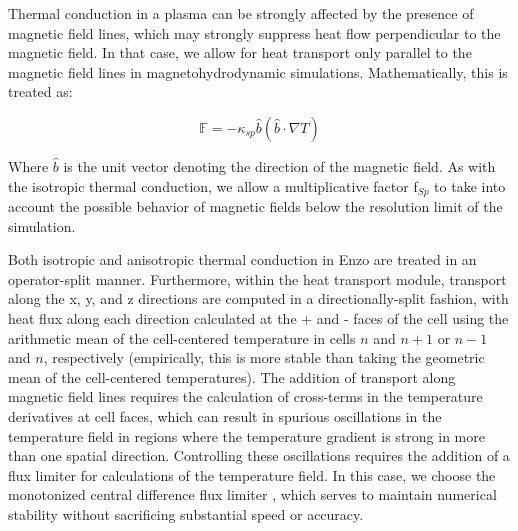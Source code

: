 Thermal conduction in a
plasma can be strongly affected by the presence of magnetic field
lines, which may strongly suppress heat flow perpendicular to the
magnetic field.  In that case, we allow for heat transport only
parallel to
the magnetic field lines in magnetohydrodynamic simulations.
Mathematically, this is treated as:

\begin{equation}
\mathbb{F} = -\kappa_{sp} \hat{b} (\hat{b} \cdot \nabla T)
\end{equation}

Where $\hat{b}$ is the unit vector denoting the direction of the
magnetic field.  As with the isotropic thermal conduction, we allow a
multiplicative factor f$_{Sp}$ to take into account the possible
behavior of magnetic fields below the resolution limit of the
simulation.

Both isotropic and anisotropic thermal conduction in Enzo are treated
in an operator-split manner.  Furthermore, within the heat transport
module, transport along the x, y, and z directions are computed in a
directionally-split fashion, with heat flux along each direction
calculated at the + and - faces of the cell using the arithmetic mean
of the cell-centered temperature in cells $n$ and $n+1$ or $n-1$ and
$n$, respectively (empirically, this is more stable than taking the
geometric mean of the cell-centered temperatures).  The addition of
transport along magnetic field lines requires the calculation of
cross-terms in the temperature derivatives at cell faces, which can
result in spurious oscillations in the temperature field in regions
where the temperature gradient is strong in more than one spatial
direction.  Controlling these oscillations requires the addition of a
flux limiter for calculations of the temperature field.  In this case,
we choose the monotonized central difference flux limiter \citep{1977JCoPh..23..263V}, which serves to maintain numerical stability without
sacrificing substantial speed or accuracy.
